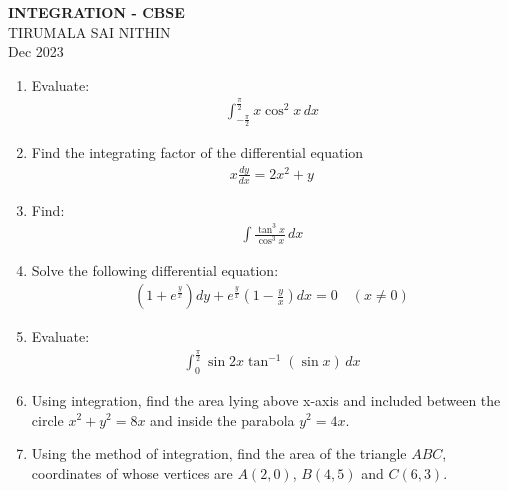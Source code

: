 \documentclass{article}
\newcommand{\brak}[1]{\ensuremath{\left(#1\right)}}
\begin{document}
\begin{center}
\textbf{INTEGRATION - CBSE}\\
TIRUMALA SAI NITHIN\\
Dec 2023
\end{center}

\begin{enumerate}

\item Evaluate:
\begin{align}
\int^{\frac{\pi}{2}}_{-\frac{\pi}{2}} x \cos^2 x \, dx
\end{align}

\item Find the integrating factor of the differential equation
\begin{align}
x \frac{dy}{dx} = 2x^2 + y
\end{align}

\item Find:
\begin{align}
\int \frac{\tan^3 x}{\cos^3 x} \, dx
\end{align}

\item Solve the following differential equation:
\begin{align}
\brak{1 + e^{\frac{y}{x}}} dy + e^{\frac{y}{x}} \brak{1 - \frac{y}{x}} dx = 0
\quad \brak{x \neq 0}
\end{align}

\item Evaluate:
\begin{align}
\int^{\frac{\pi}{2}}_{0} \sin 2x \tan^{-1}(\sin x) \, dx
\end{align}

\item Using integration, find the area lying above x-axis and included between
the circle $x^2 + y^2 = 8x$ and inside the parabola $y^2 = 4x$.

\item Using the method of integration, find the area of the triangle $ABC$,
coordinates of whose vertices are $A\brak{2,0}$, $B\brak{4,5}$ and $C\brak{6,3}$.

\end{enumerate}
\end{document}
